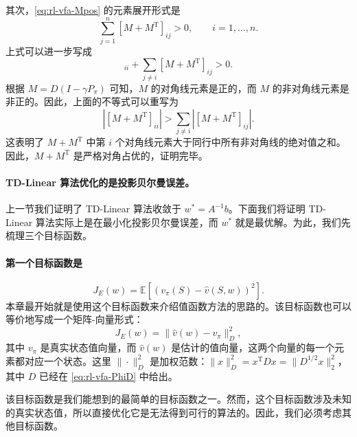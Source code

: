\begin{note}[方框 8.4：证明矩阵 $A = \Phi^{\mathrm{T}}D(I - \gamma P_{\pi})\Phi$ 可逆且正定]
其次，\cref{eq:rl-vfa-Mpos} 的元素展开形式是
\begin{equation*}
\sum_{j=1}^{n} [M + M^{\mathrm{T}}]_{ij} > 0, \qquad i = 1, \ldots, n.
\end{equation*}
上式可以进一步写成
\begin{equation*}
[M + M^{\mathrm{T}}]_{ii} + \sum_{j \neq i} [M + M^{\mathrm{T}}]_{ij} > 0.
\end{equation*}
根据 $M = D(I - \gamma P_{\pi})$ 可知，$M$ 的对角线元素是正的，而 $M$ 的非对角线元素是非正的。因此，上面的不等式可以重写为
\begin{equation*}
\left| [M + M^{\mathrm{T}}]_{ii} \right| > \sum_{j \neq i} \left| [M + M^{\mathrm{T}}]_{ij} \right|.
\end{equation*}
这表明了 $M + M^{\mathrm{T}}$ 中第 $i$ 个对角线元素大于同行中所有非对角线的绝对值之和。因此，$M + M^{\mathrm{T}}$ 是严格对角占优的，证明完毕。
\end{note}

\paragraph{TD-Linear 算法优化的是投影贝尔曼误差。}上一节我们证明了 TD-Linear 算法收敛于 $w^{*} = A^{-1}b$。下面我们将证明 TD-Linear 算法实际上是在最小化投影贝尔曼误差，而 $w^{*}$ 就是最优解。为此，我们先梳理三个目标函数。

\paragraph{第一个目标函数是}
\begin{equation*}
J_{E}(w) = \mathbb{E}[(v_{\pi}(S) - \hat{v}(S, w))^{2}].
\end{equation*}
本章最开始就是使用这个目标函数来介绍值函数方法的思路的。该目标函数也可以等价地写成一个矩阵-向量形式：
\begin{equation*}
J_{E}(w) = \| \hat{v}(w) - v_{\pi} \|_{D}^{2},
\end{equation*}
其中 $v_{\pi}$ 是真实状态值向量，而 $\hat{v}(w)$ 是估计的值向量，这两个向量的每一个元素都对应一个状态。这里 $\| \cdot \|_D^2$ 是加权范数：$\| x\|_D^2 = x^{\mathrm{T}}Dx = \| D^{1/2}x\|_2^2$，其中 $D$ 已经在 \cref{eq:rl-vfa-PhiD} 中给出。

该目标函数是我们能想到的最简单的目标函数之一。然而，这个目标函数涉及未知的真实状态值，所以直接优化它是无法得到可行的算法的。因此，我们必须考虑其他目标函数。

